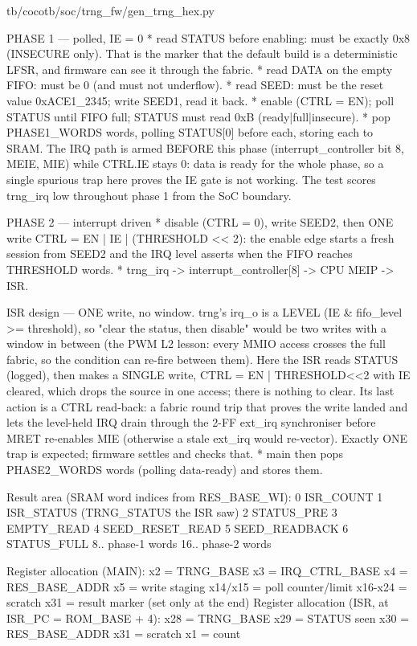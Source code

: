 \begin{relocated}{tb/cocotb/soc/trng_fw/gen_trng_hex.py}
\begin{textblock}
PHASE 1 — polled, IE = 0
* read STATUS before enabling: must be exactly 0x8 (INSECURE only). That is the marker that the
default build is a deterministic LFSR, and firmware can see it through the fabric.
* read DATA on the empty FIFO: must be 0 (and must not underflow).
* read SEED: must be the reset value 0xACE1_2345; write SEED1, read it back.
* enable (CTRL = EN); poll STATUS until FIFO full; STATUS must read 0xB (ready|full|insecure).
* pop PHASE1_WORDS words, polling STATUS[0] before each, storing each to SRAM.
The IRQ path is armed BEFORE this phase (interrupt_controller bit 8, MEIE, MIE) while CTRL.IE
stays 0: data is ready for the whole phase, so a single spurious trap here proves the IE gate is
not working. The test scores trng_irq low throughout phase 1 from the SoC boundary.

PHASE 2 — interrupt driven
* disable (CTRL = 0), write SEED2, then ONE write CTRL = EN | IE | (THRESHOLD << 2): the enable
edge starts a fresh session from SEED2 and the IRQ level asserts when the FIFO reaches
THRESHOLD words.
* trng_irq -> interrupt_controller[8] -> CPU MEIP -> ISR.

ISR design — ONE write, no window. trng's irq_o is a LEVEL (IE & fifo_level >= threshold), so
"clear the status, then disable" would be two writes with a window in between (the PWM L2
lesson: every MMIO access crosses the full fabric, so the condition can re-fire between them).
Here the ISR reads STATUS (logged), then makes a SINGLE write, CTRL = EN | THRESHOLD<<2 with IE
cleared, which drops the source in one access; there is nothing to clear. Its last action is a
CTRL read-back: a fabric round trip that proves the write landed and lets the level-held IRQ
drain through the 2-FF ext_irq synchroniser before MRET re-enables MIE (otherwise a stale
ext_irq would re-vector). Exactly ONE trap is expected; firmware settles and checks that.
* main then pops PHASE2_WORDS words (polling data-ready) and stores them.

Result area (SRAM word indices from RES_BASE_WI):
0 ISR_COUNT          1 ISR_STATUS (TRNG_STATUS the ISR saw)
2 STATUS_PRE         3 EMPTY_READ         4 SEED_RESET_READ    5 SEED_READBACK
6 STATUS_FULL        8.. phase-1 words    16.. phase-2 words

Register allocation (MAIN):
x2 = TRNG_BASE  x3 = IRQ_CTRL_BASE  x4 = RES_BASE_ADDR  x5 = write staging
x14/x15 = poll counter/limit  x16-x24 = scratch  x31 = result marker (set only at the end)
Register allocation (ISR, at ISR_PC = ROM_BASE + 4):
x28 = TRNG_BASE  x29 = STATUS seen  x30 = RES_BASE_ADDR  x31 = scratch  x1 = count
\end{textblock}

\end{relocated}

